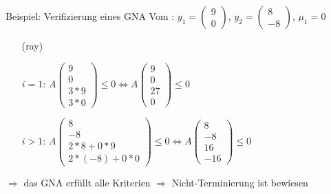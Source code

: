 \begin{frame}
	\begin{exampleblock}{Beispiel: Verifizierung eines GNA }
		Vom \solver: $y_1=\begin{pmatrix} 9 \\ 0 \end{pmatrix}$, $y_2=\begin{pmatrix} 8 \\ -8 \end{pmatrix}$, $\mu_1=0$\newline
		\begin{itemize}
			\setlength{\itemindent}{0.5cm}
			\item[(ray)]
			\item[$i=1$:]  $A\begin{pmatrix} 9 \\ 0 \\ 3*9 \\ 3*0 \end{pmatrix} \le 0 \Leftrightarrow A\begin{pmatrix} 9 \\ 0 \\ 27 \\ 0 \end{pmatrix} \le 0$ \checkmark
			\item[$i>1$:] $A\begin{pmatrix} 8 \\ -8 \\ 2*8+0*9 \\ 2*(-8)+0*0 \end{pmatrix} \le 0 \Leftrightarrow A\begin{pmatrix} 8 \\ -8 \\ 16 \\ -16 \end{pmatrix} \le 0$ \checkmark
		\end{itemize}
		$\Rightarrow$ das GNA erf\"ullt alle Kriterien $\Rightarrow$ Nicht-Terminierung ist bewiesen
	\end{exampleblock}
\end{frame}






